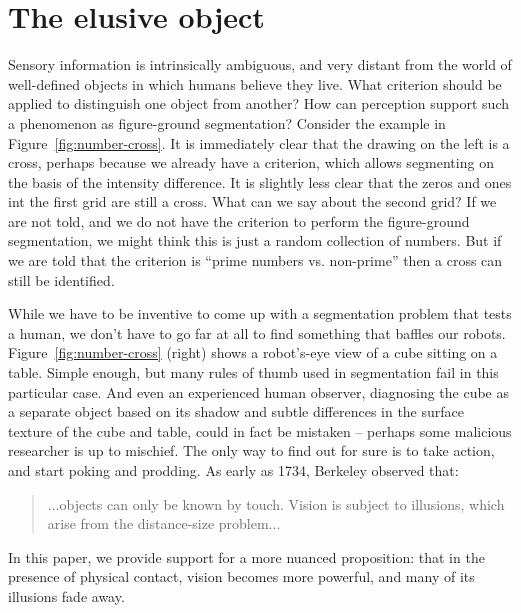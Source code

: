 \ifverbose 

\section{The elusive object}

\label{sect:introduction}

Sensory information is intrinsically ambiguous, and very distant from
the world of well-defined objects in which humans believe they live.  
What criterion should be applied to distinguish one object from
another?  How can perception support such a phenomenon as figure-ground
segmentation?  
Consider the example in Figure~\ref{fig:number-cross}.  It is
immediately clear that the drawing on the left is a cross, perhaps
because we already have a criterion, which allows segmenting on the
basis of the intensity difference. It is slightly less clear that the
zeros and ones int the first grid are still a cross. What can we say
about the second grid? If we are not told, and we do not have
the criterion to perform the figure-ground segmentation, we might
think this is just a random collection of numbers. But if we are told
that the criterion is ``prime numbers vs. non-prime'' then a cross can
still be identified.

While we have to be inventive to come up with a segmentation problem
that tests a human, we don't have to go far at all to find something
that baffles our robots.  Figure~\ref{fig:number-cross} (right) shows a
robot's-eye view of a cube sitting on a table.  Simple enough, but
many rules of thumb used in segmentation fail in this particular case.
And even an experienced human observer, diagnosing the cube as a
separate object based on its shadow and subtle differences in the
surface texture of the cube and table, could in fact be mistaken --
perhaps some malicious researcher is up to mischief.  The only way to
find out for sure is to take action, and start poking and prodding.
As early as 1734, Berkeley observed that:
%
\begin{quote}
...objects can only be known by
touch. Vision is subject to illusions, which arise from the
distance-size problem... \cite{berkeley72new}
\end{quote}
%
In this paper, we provide support for a more nuanced proposition: that
in the presence of physical contact, vision becomes more powerful, and many of
its illusions fade away.


